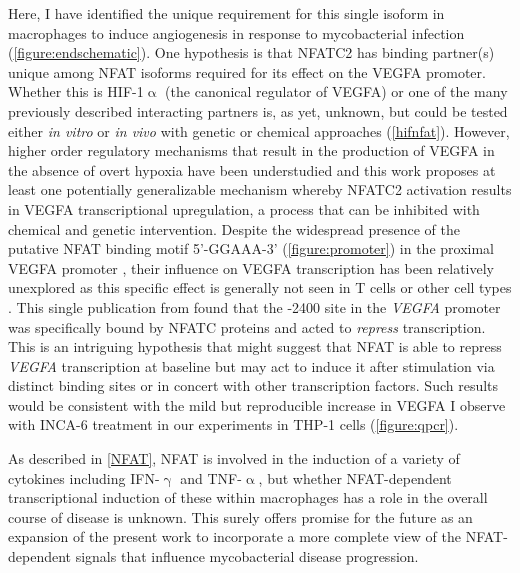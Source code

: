 Here, I have identified the unique requirement for this single isoform in macrophages to induce angiogenesis in response to mycobacterial infection (\autoref{figure:endschematic}). One hypothesis is that NFATC2 has binding partner(s) unique among NFAT isoforms required for its effect on the VEGFA promoter. Whether this is HIF\hyp{}1$\upalpha$ (the canonical regulator of VEGFA) or one of the many previously described interacting partners is, as yet, unknown, but could be tested either \textit{in vitro} or \textit{in vivo} with genetic or chemical approaches (\autoref{hifnfat}). However, higher order regulatory mechanisms that result in the production of VEGFA in the absence of overt hypoxia have been understudied and this work proposes at least one potentially generalizable mechanism whereby NFATC2 activation results in VEGFA transcriptional upregulation, a process that can be inhibited with chemical and genetic intervention. Despite the widespread presence of the putative NFAT binding motif 5'\hyp{}GGAAA\hyp{}3' (\autoref{figure:promoter}) in the proximal VEGFA promoter \citep{Gearing2019}, their influence on VEGFA transcription has been relatively unexplored as this specific effect is generally not seen in T cells or other cell types \citep{Chang2004}. This single publication from \citet{Chang2004} found that the \hyp{}2400 site in the \textit{VEGFA} promoter was specifically bound by NFATC proteins and acted to \textit{repress} transcription. This is an intriguing hypothesis that might suggest that NFAT is able to repress \textit{VEGFA} transcription at baseline but may act to induce it after stimulation via distinct binding sites or in concert with other transcription factors. Such results would be consistent with the mild but reproducible increase in VEGFA I observe with INCA\hyp{}6 treatment in our experiments in THP\hyp{}1 cells (\autoref{figure:qpcr}). 

As described in \autoref{NFAT}, NFAT is involved in the induction of a variety of cytokines including IFN\hyp{}$\upgamma$ and TNF\hyp{}$\upalpha$, but whether NFAT\hyp{}dependent transcriptional induction of these within macrophages has a role in the overall course of disease is unknown. This surely offers promise for the future as an expansion of the present work to incorporate a more complete view of the NFAT\hyp{}dependent signals that influence mycobacterial disease progression.

